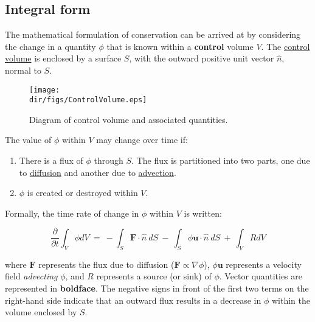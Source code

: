\subsection{Integral form}

The mathematical formulation of conservation can be arrived at by considering the change in a quantity 
$\phi$ that is known within a \textbf{control} volume $V$. The \href{http://en.wikipedia.org/wiki/Control_volume}
{control volume} is enclosed by a surface $S$, with the outward positive unit vector $\hat n$, normal to $S$.

\begin{figure}
  \begin{center}
    \texttt{[image: \\dir/figs/ControlVolume.eps]}
  \end{center}
  \caption{Diagram of control volume and associated quantities.}
  \label{fig:controlvol}
\end{figure} 

The value of $\phi$ within $V$ may change over time if:

\begin{enumerate}
\itemsep1pt\parskip0pt
\item
  There is a flux of $\phi$ through $S$. The flux is partitioned into two parts,
  one due to \href{http://en.wikipedia.org/wiki/Diffusion}{diffusion} and another 
  due to \href{http://en.wikipedia.org/wiki/Advection}{advection}.
\item
  $\phi$ is created or destroyed within $V$.
\end{enumerate}

Formally, the time rate of change in $\phi$ within $V$ is written:

\begin{equation}
{\frac{ \partial }{ \partial t}} { \int }_{ V} \phi dV~ = ~ -{ \int }_{ S} {\mathbf F}
    {\cdot} \hat n~ dS~ - ~{ \int }_{ S} \phi {\mathbf u} {\cdot} \hat n ~ dS~
    + ~{ \int }_{ V} R dV
    \label{eq:intcons}
\end{equation}

\noindent
where ${\mathbf F}$ represents the flux due to diffusion
($\mathbf{F} \propto \nabla \phi$), $\phi {\mathbf u}$ represents a velocity field 
\emph{advecting} $\phi$, and $R$ represents a source (or sink) of $\phi$. Vector quantities are
represented in \textbf{boldface}. The negative signs in front of the first two terms on the right-hand 
side indicate that an outward flux results in a decrease in $\phi$ within the volume enclosed by $S$.

